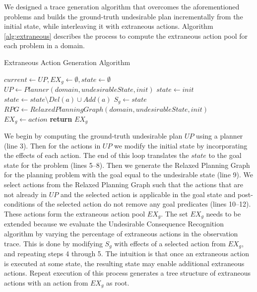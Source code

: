  
We designed a trace generation algorithm that overcomes the aforementioned problems and builds the ground-truth undesirable plan incrementally from the initial state, while interleaving it with extraneous actions.
Algorithm \ref{alg:extraneous} describes the process to compute the extraneous action pool for each problem in a domain.
\begin{algorithm}
    \caption{Extraneous Action Generation Algorithm}
    \label{alg:extraneous}
    \begin{algorithmic}[1]
        	\State $current\gets UP, EX_{g}\gets \emptyset, state \gets \emptyset$
        	\State $UP\gets Planner(domain,undesirableState,init)$
        	\State $state \gets init$
        		\State $state\gets state\setminus Del(a)\cup Add(a)$
        		\EndIf
        	\EndFor
        	\State $S_{g}\gets state$
        	\State $RPG \gets RelaxedPlanningGraph(domain,undesirableState,init)$
				\State $EX_{g} \gets action$
				\EndIf        	        	
           	\EndFor
            \State \textbf{return} $EX_{g}$
        \EndProcedure
    \end{algorithmic}
\end{algorithm}
We begin by computing the ground-truth undesirable plan $UP$ using a planner (line 3). 
Then for the actions in $UP$ we modify the initial state by incorporating the effects of each action. 
The end of this loop translates the $state$ to the goal state for the problem (lines 5--8).
Then we generate the Relaxed Planning Graph for the planning problem with the goal equal to the undesirable state (line 9).
We select actions from the Relaxed Planning Graph such that the actions that are not already in $UP$ and the selected action is applicable in the goal state and post-conditions of the selected action do not remove any goal predicates (lines 10--12). 
These actions form the extraneous action pool $EX_{g}$.
The set $EX_{g}$ needs to be extended because we evaluate the Undesirable Consequence Recognition algorithm by varying the percentage of extraneous actions in the observation trace.
This is done by modifying $S_{g}$ with effects of a selected action from $EX_{g}$, and repeating steps 4 through 5. 
The intuition is that once an extraneous action is executed at some state, the resulting state may enable additional extraneous actions. 
Repeat execution of this process generates a tree structure of extraneous actions with an action from $EX_{g}$ as root. 

